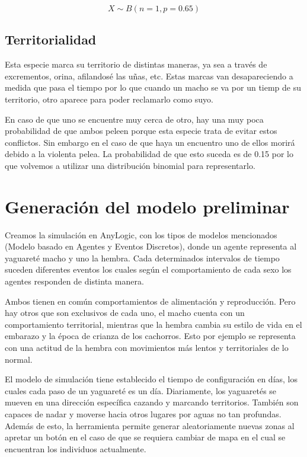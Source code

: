         \begin{equation}
            X \sim B(n=1, p=0.65)
        \end{equation}

    \subsection{Territorialidad}
        Esta especie marca su territorio de distintas maneras, ya sea a través de excrementos, orina, afilandosé las uñas, etc. Estas marcas van desapareciendo a medida que pasa el tiempo por lo que cuando un macho se va por un tiemp de su territorio, otro aparece para poder reclamarlo como suyo.
        
        En caso de que uno se encuentre muy cerca de otro, hay una muy poca probabilidad de que ambos peleen porque esta especie trata de evitar estos conflictos. Sin embargo en el caso de que haya un encuentro uno de ellos morirá debido a la violenta pelea.
        La probabilidad de que esto suceda es de 0.15 por lo que volvemos a utilizar una distribución binomial para representarlo.

\section{Generación del modelo preliminar}
    Creamos la simulación en AnyLogic, con los tipos de modelos mencionados (Modelo basado en Agentes y Eventos Discretos), donde un agente representa al yaguareté macho y uno la hembra. Cada determinados intervalos de tiempo suceden diferentes eventos los cuales según el comportamiento de cada sexo los agentes responden de distinta manera.

    Ambos tienen en común comportamientos de alimentación y reproducción. Pero hay otros que son exclusivos de cada uno, el macho cuenta con un comportamiento territorial, mientras que la hembra cambia su estilo de vida en el embarazo y la época de crianza de los cachorros. Esto por ejemplo se representa con una actitud de la hembra con movimientos más lentos y territoriales de lo normal.

    El modelo de simulación tiene establecido el tiempo de configuración en días, los cuales cada paso de un yaguareté es un día. Diariamente, los yaguaretés se mueven en una dirección específica cazando y marcando territorios. También son capaces de nadar y moverse hacia otros lugares por aguas no tan profundas. Además de esto, la herramienta permite generar aleatoriamente nuevas zonas al apretar un botón en el caso de que se requiera cambiar de mapa en el cual se encuentran los individuos actualmente.

